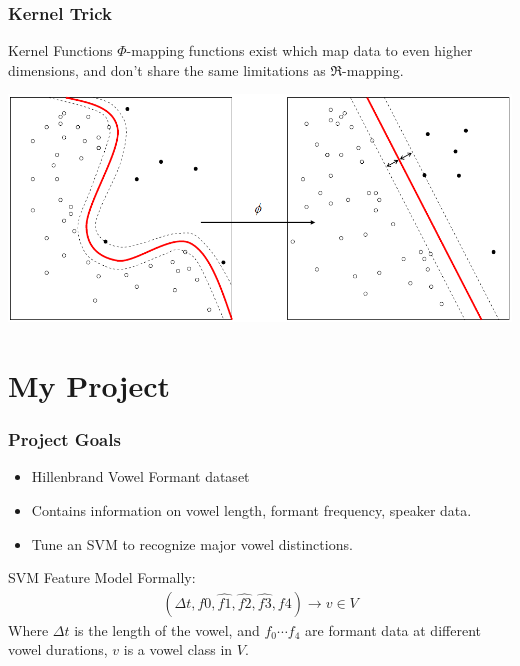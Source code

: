 \documentclass{beamer}
\begin{document}

\begin{frame}
\frametitle{Kernel Trick}

\begin{block}{Kernel Functions}
$\Phi$-mapping functions exist which map data to even higher dimensions, and don't share the same limitations as $\Re$-mapping.
\end{block}

\includegraphics[scale=.45]{../figures/Kernel_Machine.png}

\end{frame}


\section{My Project}


\begin{frame}
\frametitle{Project Goals}

\begin{itemize}
\item Hillenbrand Vowel Formant dataset
\item Contains information on vowel length, formant frequency, speaker data.
\item Tune an SVM to recognize major vowel distinctions.
\end{itemize}

\begin{block}{SVM Feature Model}
Formally:
\begin{align}
(\Delta t,f0,\hat{f1},\hat{f2},\hat{f3},f4)\longrightarrow v\in V
\end{align}
Where $\Delta t$ is the length of the vowel, and $f_0\cdots f_4$ are formant data at different vowel durations, $v$ is a vowel class in $V$.
\end{block}

\end{frame}
\end{document}
